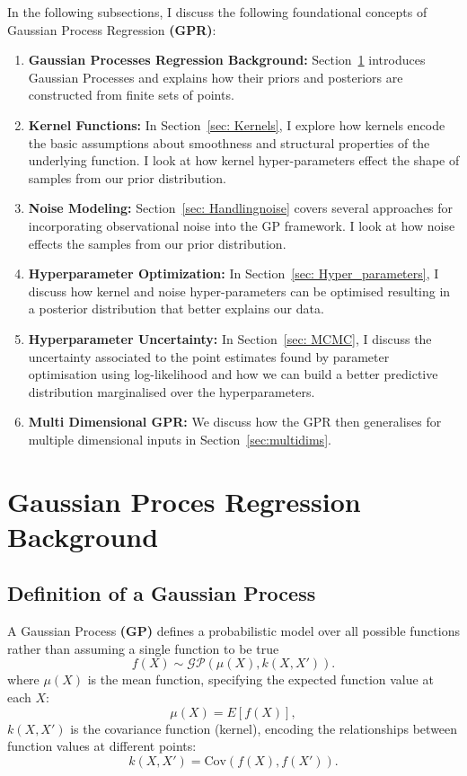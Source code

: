 \documentclass{ucdgradtaughtthesis}
\begin{document}
In the following subsections, I discuss the following foundational concepts of Gaussian Process Regression \textbf{(GPR)}:
\begin{enumerate}
    \item \textbf{Gaussian Processes Regression Background:} Section~\ref{sec: GP_backgroound} introduces Gaussian Processes and explains how their priors and posteriors are constructed from finite sets of points.
    \item \textbf{Kernel Functions:} In Section~\ref{sec: Kernels}, I explore how kernels encode the basic assumptions about smoothness and structural properties of the underlying function. I look at how kernel hyper-parameters effect the shape of samples from our prior distribution.
    \item \textbf{Noise Modeling:} Section~\ref{sec: Handlingnoise} covers several approaches for incorporating observational noise into the GP framework. I look at how noise effects the samples from our prior distribution.
    \item \textbf{Hyperparameter Optimization:} In Section~\ref{sec: Hyper_parameters}, I discuss how kernel and noise hyper-parameters can be optimised resulting in a posterior distribution that better explains our data.
    \item \textbf{Hyperparameter Uncertainty:} In Section~\ref{sec: MCMC}, I discuss the uncertainty associated to the point estimates found by parameter optimisation using log-likelihood and how we can build a better predictive distribution marginalised over the hyperparameters.
    \item \textbf{Multi Dimensional GPR:} We discuss how the GPR then generalises for multiple dimensional inputs in Section~\ref{sec:multidims}.
\end{enumerate}

\section{Gaussian Proces Regression Background}
\label{sec: GP_backgroound}
\subsection{Definition of a Gaussian Process}
\label{sec: Definition_of_GP}
%
A Gaussian Process \textbf{(GP)} defines a probabilistic model over all possible functions rather than assuming a single function to be true
\begin{equation}
f(X) \sim \mathcal{GP} (\mu(X), k(X, X')).
\label{eq: Initial_GP_distribution}
\end{equation}
where \( \mu(X) \) is the mean function, specifying the expected function value at each \( X \):
\begin{equation}
    \mu(X) = {E}[f(X)],
    \label{eq: meandef}
\end{equation}
%
\( k(X, X') \) is the covariance function (kernel), encoding the relationships between function values at different points:
\begin{equation}
    k(X, X') = \text{Cov}(f(X), f(X')).
    \label{eq: kerneldef}
\end{equation}
%
\end{document}
